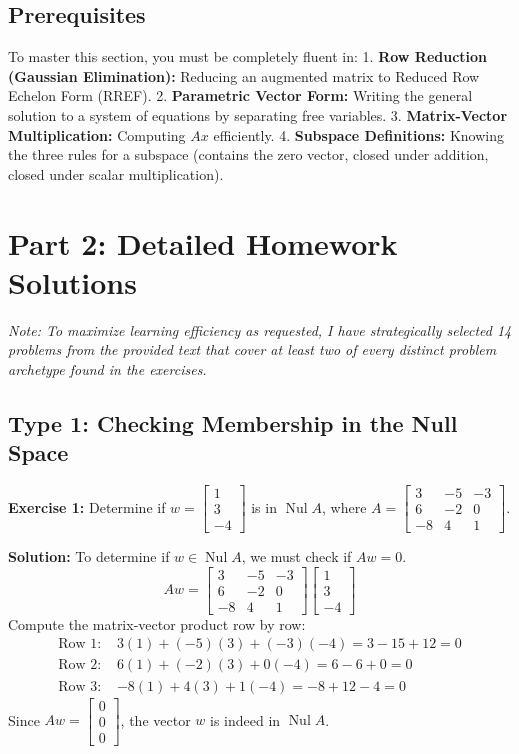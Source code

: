 \documentclass[11pt]{article}
\begin{document}
\subsection{Prerequisites}
To master this section, you must be completely fluent in:
1. \textbf{Row Reduction (Gaussian Elimination):} Reducing an augmented matrix to Reduced Row Echelon Form (RREF).
2. \textbf{Parametric Vector Form:} Writing the general solution to a system of equations by separating free variables.
3. \textbf{Matrix-Vector Multiplication:} Computing $Ax$ efficiently.
4. \textbf{Subspace Definitions:} Knowing the three rules for a subspace (contains the zero vector, closed under addition, closed under scalar multiplication).

\newpage

\section{Part 2: Detailed Homework Solutions}
\textit{Note: To maximize learning efficiency as requested, I have strategically selected 14 problems from the provided text that cover at least two of every distinct problem archetype found in the exercises.}

\subsection{Type 1: Checking Membership in the Null Space}

\textbf{Exercise 1:} Determine if $w = \begin{bmatrix} 1 \\ 3 \\ -4 \end{bmatrix}$ is in $\operatorname{Nul} A$, where $A = \begin{bmatrix} 3 & -5 & -3 \\ 6 & -2 & 0 \\ -8 & 4 & 1 \end{bmatrix}$.

\textbf{Solution:}
To determine if $w \in \operatorname{Nul} A$, we must check if $Aw = 0$.
\[
Aw = \begin{bmatrix} 3 & -5 & -3 \\ 6 & -2 & 0 \\ -8 & 4 & 1 \end{bmatrix} \begin{bmatrix} 1 \\ 3 \\ -4 \end{bmatrix}
\]
Compute the matrix-vector product row by row:
\begin{align*}
\text{Row 1: } & 3(1) + (-5)(3) + (-3)(-4) = 3 - 15 + 12 = 0 \\
\text{Row 2: } & 6(1) + (-2)(3) + 0(-4) = 6 - 6 + 0 = 0 \\
\text{Row 3: } & -8(1) + 4(3) + 1(-4) = -8 + 12 - 4 = 0
\end{align*}
Since $Aw = \begin{bmatrix} 0 \\ 0 \\ 0 \end{bmatrix}$, the vector $w$ is indeed in $\operatorname{Nul} A$.
\end{document}
